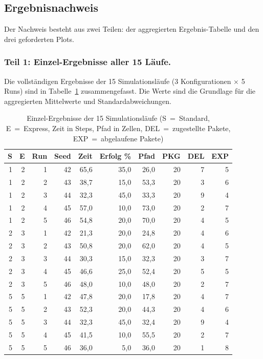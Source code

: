 
\subsection{Ergebnisnachweis}
\label{sssec:performance_5a_nachweis}

Der Nachweis besteht aus zwei Teilen: der aggregierten Ergebnis-Tabelle und den drei geforderten Plots.

\subsubsection{Teil 1: Einzel-Ergebnisse aller 15 Läufe.}
Die vollständigen Ergebnisse der 15 Simulationsläufe (3 Konfigurationen
\(\times\) 5 Runs) sind in Tabelle~\ref{tab:raw_5a} zusammengefasst.
Die Werte sind die Grundlage für die aggregierten Mittelwerte und
Standardabweichungen.

\begin{table}[H]
    \centering
    \small
    \begin{tabular}{r r r r r r r r r r}
        \toprule
        \textbf{S} & \textbf{E} & \textbf{Run} & \textbf{Seed} & \textbf{Zeit} & \textbf{Erfolg \%} & \textbf{Pfad} & \textbf{PKG} & \textbf{DEL} & \textbf{EXP} \\
        \midrule
        1 & 2 & 1 & 42 & 65{,}6 & 35{,}0 & 26{,}0 & 20 & 7 & 5 \\
        1 & 2 & 2 & 43 & 38{,}7 & 15{,}0 & 53{,}3 & 20 & 3 & 6 \\
        1 & 2 & 3 & 44 & 32{,}3 & 45{,}0 & 33{,}3 & 20 & 9 & 4 \\
        1 & 2 & 4 & 45 & 57{,}0 & 10{,}0 & 73{,}0 & 20 & 2 & 7 \\
        1 & 2 & 5 & 46 & 54{,}8 & 20{,}0 & 70{,}0 & 20 & 4 & 5 \\
        \midrule
        2 & 3 & 1 & 42 & 21{,}3 & 20{,}0 & 24{,}8 & 20 & 4 & 6 \\
        2 & 3 & 2 & 43 & 50{,}8 & 20{,}0 & 62{,}0 & 20 & 4 & 5 \\
        2 & 3 & 3 & 44 & 30{,}3 & 15{,}0 & 32{,}3 & 20 & 3 & 7 \\
        2 & 3 & 4 & 45 & 46{,}6 & 25{,}0 & 52{,}4 & 20 & 5 & 5 \\
        2 & 3 & 5 & 46 & 48{,}0 & 10{,}0 & 48{,}0 & 20 & 2 & 7 \\
        \midrule
        5 & 5 & 1 & 42 & 47{,}8 & 20{,}0 & 17{,}8 & 20 & 4 & 7 \\
        5 & 5 & 2 & 43 & 52{,}3 & 20{,}0 & 44{,}3 & 20 & 4 & 6 \\
        5 & 5 & 3 & 44 & 32{,}3 & 45{,}0 & 32{,}4 & 20 & 9 & 4 \\
        5 & 5 & 4 & 45 & 41{,}5 & 10{,}0 & 55{,}5 & 20 & 2 & 7 \\
        5 & 5 & 5 & 46 & 36{,}0 & 5{,}0 & 36{,}0 & 20 & 1 & 8 \\
        \bottomrule
    \end{tabular}
    \caption{Einzel-Ergebnisse der 15 Simulationsläufe (S~=~Standard, E~=~Express, Zeit in Steps, Pfad in Zellen, DEL~=~zugestellte Pakete, EXP~=~abgelaufene Pakete)}
    \label{tab:raw_5a}
\end{table}

